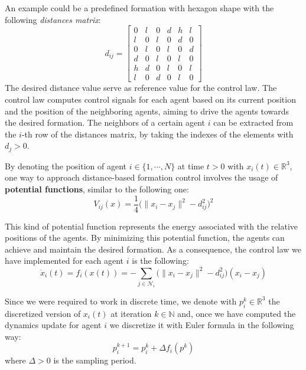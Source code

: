 \documentclass[a4paper,11pt,oneside]{book}
\begin{document}
An example could be a predefined formation with hexagon shape with the following \textit{distances matrix}:
\begin{equation}
d_{ij} =
\begin{bmatrix}
0 & l & 0 & d & h & l \\
l & 0 & l & 0 & d & 0 \\
0 & l & 0 & l & 0 & d \\
d & 0 & l & 0 & l & 0 \\
h & d & 0 & l & 0 & l \\
l & 0 & d & 0 & l & 0
\end{bmatrix}
\end{equation}
The desired distance value serve as reference value for the control law. The control law computes control signals for each agent based on its current position and the position of the neighboring agents, aiming to drive the agents towards the desired formation.
The neighbors of a certain agent $i$ can be extracted from the $i$-th row of the distances matrix, by taking the indexes of the elements with $d_j > 0$.

By denoting the position of agent $i \in \{1, \cdots, N\}$ at time $t>0$ with $x_i(t) \in \mathbb{R}^3$, one way to approach distance-based formation control involves the usage of \textbf{potential functions}, similar to the following one:
\begin{equation}
V_{ij}(x)  = \frac{1}{4} \bigg( \lVert x_i - x_j \rVert^2 - d_{ij}^2 \bigg)^2
\label{Formation_potential}
\end{equation}

This kind of potential function represents the energy associated with the relative positions of the agents. By minimizing this potential function, the agents can achieve and maintain the desired formation.
As a consequence, the control law we have implemented for each agent $i$ is the following:
\begin{equation}
\dot{x}_i(t) = f_i(x(t)) = - \sum_{j \in \mathcal{N}_i} \bigg( \lVert x_i - x_j \rVert^2 - d_{ij}^2 \bigg) (x_i - x_j )
\label{Dynamics_no_collision_avoidance}
\end{equation}

Since we were required to work in discrete time, we denote with $p_i^k \in \mathbb{R}^3$ the discretized version of $x_i(t)$ at iteration $k \in \mathbb{N}$ and, once we have computed the dynamics update for agent $i$ we discretize it with Euler formula in the following way:
\begin{equation}
p_i^{k+1} = p_i^{k} + \Delta f_i(p^k)
\end{equation}
where $\Delta > 0$ is the sampling period.
\end{document}
